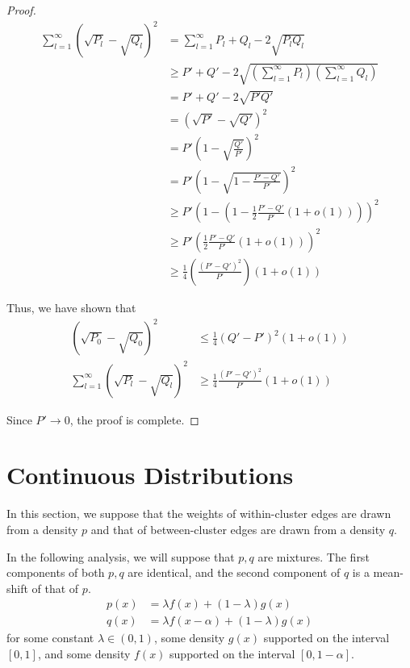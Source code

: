 \documentclass{article}
\begin{document}
\begin{proof}
\begin{align*}
\sum_{l=1}^\infty (\sqrt{P_l}  - \sqrt{Q_l})^2 &= \sum_{l=1}^\infty P_l + Q_l - 2 \sqrt{P_lQ_l} \\
 &\geq P' + Q' - 2 \sqrt{ \left( \sum_{l=1}^\infty P_l \right) \left( \sum_{l=1}^\infty Q_l \right) } \\
 &= P' + Q' - 2\sqrt{P' Q'} \\
 &= (\sqrt{P'} - \sqrt{Q'})^2 \\
 &= P' \left( 1 - \sqrt{ \frac{Q'}{P'} } \right)^2 \\ 
 &= P' \left( 1 - \sqrt{ 1 - \frac{P' - Q'}{P'} } \right)^2 \\
 &\geq P' \left( 1 - ( 1 - \frac{1}{2} \frac{P' - Q'}{P'} (1 + o(1)) ) \right)^2 \\
 &\geq P' \left( \frac{1}{2} \frac{P' - Q'}{P'} (1 + o(1)) \right)^2 \\
 &\geq \frac{1}{4} \left( \frac{(P' - Q')^2}{P'} \right) (1 + o(1)) 
\end{align*}

Thus, we have shown that 
\begin{align*}
(\sqrt{P_0} - \sqrt{Q_0})^2& \leq \frac{1}{4} (Q' - P')^2 (1 + o(1)) \\
\sum_{l=1}^\infty (\sqrt{P_l} - \sqrt{Q_l})^2 & \geq \frac{1}{4} \frac{(P' - Q')^2}{P'} (1 + o(1))
\end{align*}

Since $P' \rightarrow 0$, the proof is complete.

\end{proof}

\newpage
\section{Continuous Distributions}

In this section, we suppose that the weights of within-cluster edges are drawn from a density $p$ and that of between-cluster edges are drawn from a density $q$.

In the following analysis, we will suppose that $p,q$ are mixtures. The first components of both $p,q$ are identical, and the second component of $q$ is a mean-shift of that of $p$. 
\begin{align*}
p(x) &= \lambda f(x) + (1-\lambda) g(x) \\
q(x) &= \lambda f(x - \alpha) + (1-\lambda) g(x) 
\end{align*}
for some constant $\lambda \in (0,1)$, some density $g(x)$ supported on the interval $[0,1]$, and some density $f(x)$ supported on the interval $[0, 1-\alpha]$. \\
\end{document}
